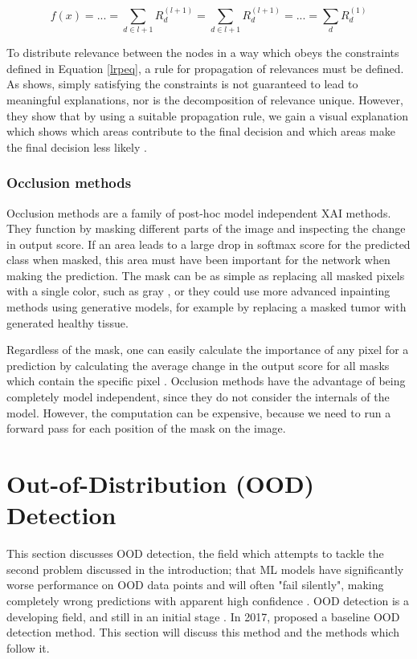 \documentclass[conference,onecolumn]{IEEEtran}
\begin{document}
\begin{equation}
f(x) = ... = \sum_{d \in l + 1} R^{(l + 1)}_d = \sum_{d \in l + 1} R^{(l + 1)}_d = ... = \sum_d R^{(1)}_d
\label{lrpeq}
\end{equation}

To distribute relevance between the nodes in a way which obeys the constraints defined in Equation \ref{lrpeq}, a rule for propagation of relevances must be defined. As \cite{lrp} shows, simply satisfying the constraints is not guaranteed to lead to meaningful explanations, nor is the decomposition of relevance unique. However, they show that by using a suitable propagation rule, we gain a visual explanation which shows which areas contribute to the final decision and which areas make the final decision less likely \cite[28]{lrp}.
\\


\subsubsection{Occlusion methods}

Occlusion methods are a family of post-hoc model independent XAI methods. They function by masking different parts of the image and inspecting the change in output score. If an area leads to a large drop in softmax score for the predicted class when masked, this area must have been important for the network when making the prediction. The mask can be as simple as replacing all masked pixels with a single color, such as gray \cite{occlusion}, or they could use more advanced inpainting methods using generative models, for example by replacing a masked tumor with generated healthy tissue. 

Regardless of the mask, one can easily calculate the importance of any pixel for a prediction by calculating the average change in the output score for all masks which contain the specific pixel \cite{diagnostic}. Occlusion methods have the advantage of being completely model independent, since they do not consider the internals of the model. However, the computation can be expensive, because we need to run a forward pass for each position of the mask on the image.

\section{Out-of-Distribution (OOD) Detection} \label{ood_intro}

This section discusses OOD detection, the field which attempts to tackle the second problem discussed in the introduction; that ML models have significantly worse performance on OOD data points and will often "fail silently", making completely wrong predictions with apparent high confidence \cite{adversarial}. OOD detection is a developing field, and still in an initial stage \cite{ooddl}. In 2017, \cite{oodbaseline} proposed a baseline OOD detection method. This section will discuss this method and the methods which follow it.
\end{document}
